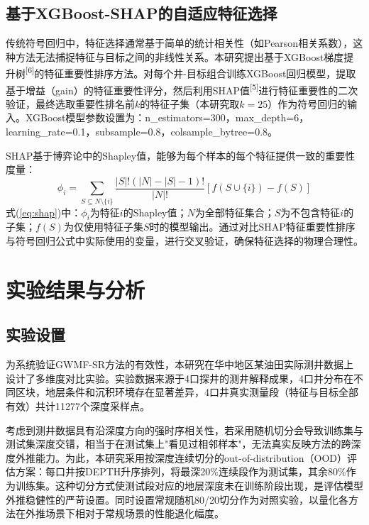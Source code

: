 \documentclass[a4paper,12pt]{ctexart}
\begin{document}
\subsection{基于XGBoost-SHAP的自适应特征选择}

传统符号回归中，特征选择通常基于简单的统计相关性（如Pearson相关系数），这种方法无法捕捉特征与目标之间的非线性关系。本研究提出基于XGBoost梯度提升树\textsuperscript{[6]}的特征重要性排序方法。对每个井-目标组合训练XGBoost回归模型，提取基于增益（gain）的特征重要性评分，然后利用SHAP值\textsuperscript{[5]}进行特征重要性的二次验证，最终选取重要性排名前$k$的特征子集（本研究取$k=25$）作为符号回归的输入。XGBoost模型参数设置为：n\_estimators=300，max\_depth=6，learning\_rate=0.1，subsample=0.8，colsample\_bytree=0.8。

SHAP基于博弈论中的Shapley值，能够为每个样本的每个特征提供一致的重要性度量：
\begin{equation}
  \phi_i = \sum_{S \subseteq N \setminus \{i\}} \frac{|S|!(|N|-|S|-1)!}{|N|!} [f(S \cup \{i\}) - f(S)] \tag{9}
  \label{eq:shap}
\end{equation}
式(\ref{eq:shap})中：$\phi_i$为特征$i$的Shapley值；$N$为全部特征集合；$S$为不包含特征$i$的子集；$f(S)$为仅使用特征子集$S$时的模型输出。通过对比SHAP特征重要性排序与符号回归公式中实际使用的变量，进行交叉验证，确保特征选择的物理合理性。

\section{实验结果与分析}

\subsection{实验设置}

为系统验证GWMF-SR方法的有效性，本研究在华中地区某油田实际测井数据上设计了多维度对比实验。实验数据来源于4口探井的测井解释成果，4口井分布在不同区块，地层条件和沉积环境存在显著差异，4口井真实测量段（特征与目标全部有效）共计11277个深度采样点。

考虑到测井数据具有沿深度方向的强时序相关性，若采用随机切分会导致训练集与测试集深度交错，相当于在测试集上"看见过相邻样本"，无法真实反映方法的跨深度外推能力。为此，本研究采用按深度连续切分的out-of-distribution（OOD）评估方案：每口井按DEPTH升序排列，将最深20\%连续段作为测试集，其余80\%作为训练集。这种切分方式使测试段对应的地层深度未在训练阶段出现，是评估模型外推稳健性的严苛设置。同时设置常规随机80/20切分作为对照实验，以量化各方法在外推场景下相对于常规场景的性能退化幅度。
\end{document}
